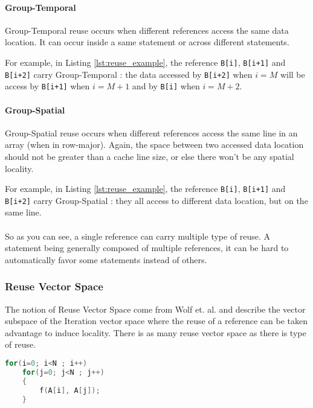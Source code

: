 \documentclass[paper=a4, fontsize=11pt]{scrartcl}
\numberwithin{equation}{section}        %
\numberwithin{figure}{section}          %
\numberwithin{table}{section}               %
\begin{document}
            \paragraph{Group-Temporal}
                Group-Temporal reuse occurs when different references access the same
                data location. It can occur inside a same statement or across different
                statements.

                For example, in Listing \ref{lst:reuse_example}, the reference
                \verb'B[i]', \verb'B[i+1]' and \verb'B[i+2]' carry Group-Temporal :
                the data accessed by \verb'B[i+2]' when $i=M$ will be access by
                \verb'B[i+1]' when $i=M+1$ and by \verb'B[i]' when $i=M+2$.

            \paragraph{Group-Spatial}
                Group-Spatial reuse occurs when different references access the same
                line in an array (when in row-major). Again, the space between
                two accessed data location should not be greater than a cache line size,
                or else there won't be any spatial locality.
                
                For example, in Listing \ref{lst:reuse_example}, the reference
                \verb'B[i]', \verb'B[i+1]' and \verb'B[i+2]' carry Group-Spatial :
                they all access to different data location, but on the same line.\\
                \\

                So as you can see, a single reference can carry multiple type of reuse.
                A statement being generally composed of multiple references, it 
                can be hard to automatically favor some statements instead of others.
        \subsubsection{Reuse Vector Space}
            The notion of Reuse Vector Space come from Wolf et. al.\cite{Wolf'91} and describe
            the vector subspace of the Iteration vector space where the reuse of
            a reference can be taken advantage to induce locality.
            There is as many reuse vector space as there is type of reuse.

\begin{lstlisting}[frame=single, language=C, caption=Simple example, label={lst:simple_example}]
for(i=0; i<N ; i++)
    for(j=0; j<N ; j++)
    {
        f(A[i], A[j]);
    }
\end{lstlisting}
\end{document}
